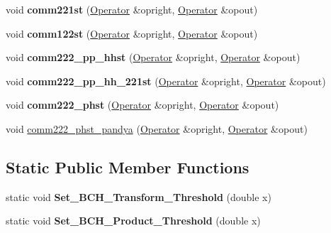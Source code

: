 \begin{DoxyCompactItemize}
\item 
\hypertarget{classOperator_a4d68427f2033c9e25c46674e555e05d2}{void {\bfseries comm221st} (\hyperlink{classOperator}{Operator} \&opright, \hyperlink{classOperator}{Operator} \&opout)}\label{classOperator_a4d68427f2033c9e25c46674e555e05d2}

\item 
\hypertarget{classOperator_ac7b9d8a707c3cfc953f070967704835e}{void {\bfseries comm122st} (\hyperlink{classOperator}{Operator} \&opright, \hyperlink{classOperator}{Operator} \&opout)}\label{classOperator_ac7b9d8a707c3cfc953f070967704835e}

\item 
\hypertarget{classOperator_a6b1dec40442bf3f9ebe0dbc52bc2d241}{void {\bfseries comm222\-\_\-pp\-\_\-hhst} (\hyperlink{classOperator}{Operator} \&opright, \hyperlink{classOperator}{Operator} \&opout)}\label{classOperator_a6b1dec40442bf3f9ebe0dbc52bc2d241}

\item 
\hypertarget{classOperator_a850ad8c78ae948a6243e6041eaee5b64}{void {\bfseries comm222\-\_\-pp\-\_\-hh\-\_\-221st} (\hyperlink{classOperator}{Operator} \&opright, \hyperlink{classOperator}{Operator} \&opout)}\label{classOperator_a850ad8c78ae948a6243e6041eaee5b64}

\item 
\hypertarget{classOperator_a0f3ee31f13fff9cb88e0e107e2acdf8a}{void {\bfseries comm222\-\_\-phst} (\hyperlink{classOperator}{Operator} \&opright, \hyperlink{classOperator}{Operator} \&opout)}\label{classOperator_a0f3ee31f13fff9cb88e0e107e2acdf8a}

\item 
void \hyperlink{classOperator_a896cd6f88a45ae1a41b9a667d1a70202}{comm222\-\_\-phst\-\_\-pandya} (\hyperlink{classOperator}{Operator} \&opright, \hyperlink{classOperator}{Operator} \&opout)
\end{DoxyCompactItemize}
\subsection*{Static Public Member Functions}
\begin{DoxyCompactItemize}
\item 
\hypertarget{classOperator_a6f505221635444cb0b489b9ac600fd61}{static void {\bfseries Set\-\_\-\-B\-C\-H\-\_\-\-Transform\-\_\-\-Threshold} (double x)}\label{classOperator_a6f505221635444cb0b489b9ac600fd61}

\item 
\hypertarget{classOperator_a2c42843a1a557f2ab568d106e8fd23e8}{static void {\bfseries Set\-\_\-\-B\-C\-H\-\_\-\-Product\-\_\-\-Threshold} (double x)}\label{classOperator_a2c42843a1a557f2ab568d106e8fd23e8}

\end{DoxyCompactItemize}
